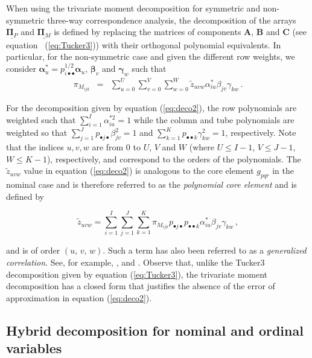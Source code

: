 When using the trivariate moment decomposition for symmetric and non-symmetric three-way correspondence analysis, the decomposition of the arrays $\underline{\bm{\Pi}_{P}}$ and $\underline{\bm{\Pi}_{M}}$ is defined by replacing the matrices of components $\mathbf{A}$, $\mathbf{B}$ and  $\mathbf{C}$  (see equation ~(\ref{eq:Tucker3})) with their orthogonal polynomial equivalents. In particular, for the non-symmetric case and given the different row weights, we consider $\bm{\alpha}^*_{u} = p^{1/2}_{i\bullet \bullet} \bm{\alpha}_{u}$, $\bm{\beta}_{v}$ and $\bm{\gamma}_{w}$ such that
\begin{eqnarray}
 {\pi_{M_{ijk}}} & = &  \sum_{u=0}^{U} \sum_{v=0}^{V} \sum_{w=0}^{W}  \tilde{z}_{uvw} \alpha^*_{iu} \beta_{jv} \gamma_{kw}  \, .
\label{eq:deco2}
\end{eqnarray}

\noindent For the decomposition given by equation (\ref{eq:deco2}), the row polynomials are weighted such that $\sum_{i=1}^{I} \alpha^{*2}_{iu}=1$ while the column and tube polynomials are weighted so that $\sum_{j=1}^{J} p_{\bullet j \bullet}\beta^{2}_{jv}=1$ and $\sum_{k=1}^{K} p_{\bullet \bullet k}\gamma^{2}_{kw}=1$, respectively. Note that the indices $u,v,w$ are from 0 to $U$, $V$ and $W$ (where $U\leq I-1$, $V\leq J-1$, $W\leq K-1$), respectively, and correspond to the orders of the polynomials. The $\tilde{z}_{uvw}$ value in equation (\ref{eq:deco2}) is analogous to the core element $g_{pqr}$ in the nominal case and is therefore referred to as the \textit{polynomial core element} and is defined by

\[
\tilde{z}_{uvw}=\sum_{i=1}^I\sum_{j=1}^J\sum_{k=1}^K  {\pi}_{M_{ijk}}p_{\bullet j\bullet}p_{\bullet\bullet k}\alpha^*_{iu}\beta_{jv}\gamma_{kw} \,,
\] 

\noindent and is of order $\left(u,\,v,\,w\right)$. Such a term has also been referred to as a {\it generalized correlation}. See, for example, \cite{raybeh09}, \citet[Chap. 6]{behlom14} and \citet[Chap. 5]{behlom21b}. Observe that, unlike the Tucker3 decomposition given by equation (\ref{eq:Tucker3}), the trivariate moment decomposition has a closed form that justifies the absence of the error of approximation in equation (\ref{eq:deco2}).
\subsection{Hybrid decomposition for nominal and ordinal variables}
\label{hybrid}

